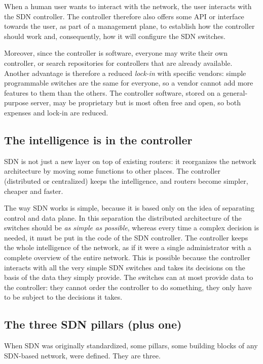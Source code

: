 When a human user wants to interact with the network, the user interacts with the SDN controller. The controller therefore also offers some API or interface towards the user, as part of a management plane, to establish how the controller should work and, consequently, how it will configure the SDN switches.

Moreover, since the controller is software, everyone may write their own controller, or search repositories for controllers that are already available. Another advantage is therefore a reduced \emph{lock-in} with specific vendors: simple programmable switches are the same for everyone, so a vendor cannot add more features to them than the others. The controller software, stored on a general-purpose server, may be proprietary but is most often free and open, so both expenses and lock-in are reduced.

\subsection{The intelligence is in the controller}

SDN is not just a new layer on top of existing routers: it reorganizes the network architecture by moving some functions to other places. The controller (distributed or centralized) keeps the intelligence, and routers become simpler, cheaper and faster.

The way SDN works is simple, because it is based only on the idea of separating control and data plane. In this separation the distributed architecture of the switches should be \emph{as simple as possible}, whereas every time a complex decision is needed, it must be put in the code of the SDN controller. The controller keeps the whole intelligence of the network, as if it were a single administrator with a complete overview of the entire network. This is possible because the controller interacts with all the very simple SDN switches and takes its decisions on the basis of the data they simply provide. The switches can at most provide data to the controller: they cannot order the controller to do something, they only have to be subject to the decisions it takes.

\subsection{The three SDN pillars (plus one)}

When SDN was originally standardized, some pillars, some building blocks of any SDN-based network, were defined. They are three.

